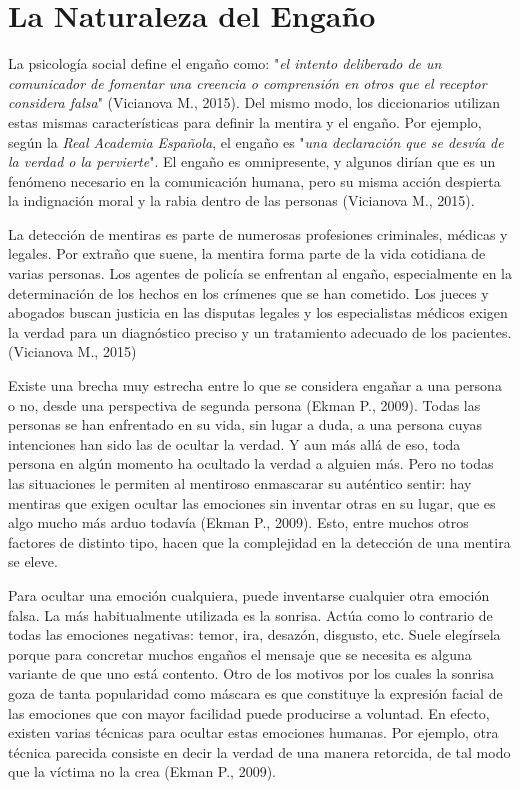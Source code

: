\section{La Naturaleza del Engaño}
La psicología social define el engaño como: "\textit{el intento deliberado de un comunicador de fomentar una creencia o comprensión en otros que el receptor considera falsa}" (Vicianova M., 2015). Del mismo modo, los diccionarios utilizan estas mismas características para definir la mentira y el engaño. Por ejemplo, según la \textit{Real Academia Española}, el engaño es "\textit{una declaración que se desvía de la verdad o la pervierte}". El engaño es omnipresente, y algunos dirían que es un fenómeno necesario en la comunicación humana, pero su misma acción despierta la indignación moral y la rabia dentro de las personas (Vicianova M., 2015). 

La detección de mentiras es parte de numerosas profesiones criminales, médicas y legales. Por extraño que suene, la mentira forma parte de la vida cotidiana de varias personas. Los agentes de policía se enfrentan al engaño, especialmente en la determinación de los hechos en los crímenes que se han cometido. Los jueces y abogados buscan justicia en las disputas legales y los especialistas médicos exigen la verdad para un diagnóstico preciso y un tratamiento adecuado de los pacientes. (Vicianova M., 2015)

Existe una brecha muy estrecha entre lo que se considera engañar a una persona o no, desde una perspectiva de segunda persona (Ekman P., 2009). Todas las personas se han enfrentado en su vida, sin lugar a duda, a una persona cuyas intenciones han sido las de ocultar la verdad. Y aun más allá de eso, toda persona en algún momento ha ocultado la verdad a alguien más. Pero no todas las situaciones le permiten al mentiroso enmascarar su auténtico sentir: hay mentiras que exigen ocultar las emociones sin inventar otras en su lugar, que es algo mucho más arduo todavía (Ekman P., 2009). Esto, entre muchos otros factores de distinto tipo, hacen que la complejidad en la detección de una mentira se eleve.

Para ocultar una emoción cualquiera, puede inventarse cualquier otra emoción falsa. La más habitualmente utilizada es la sonrisa. Actúa como lo contrario de todas las emociones negativas: temor, ira, desazón, disgusto, etc. Suele elegírsela porque para concretar muchos engaños el mensaje que se necesita es alguna variante de que uno está contento. Otro de los motivos por los cuales la sonrisa goza de tanta popularidad como máscara es que constituye la expresión facial de las emociones que con mayor facilidad puede producirse a voluntad. En efecto, existen varias técnicas para ocultar estas emociones humanas. Por ejemplo, otra técnica parecida consiste en decir la verdad de una manera retorcida, de tal modo que la víctima no la crea (Ekman P., 2009).

